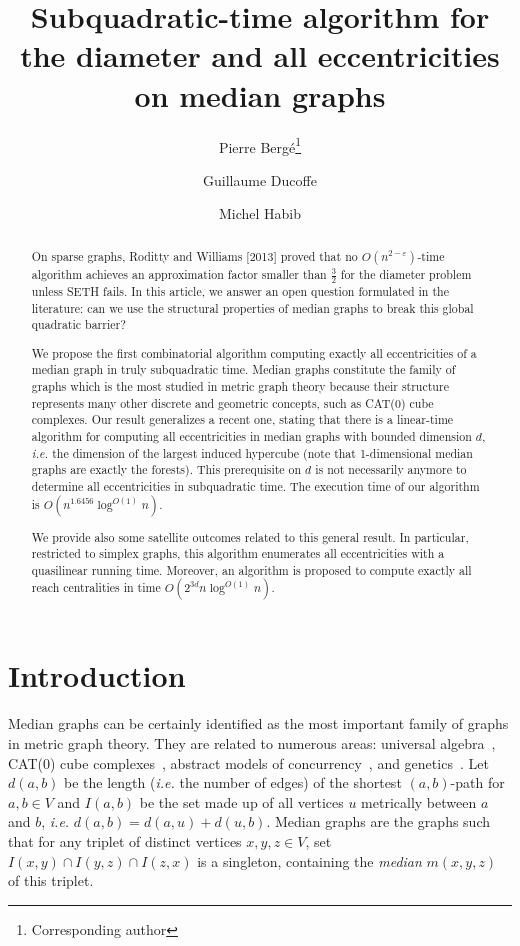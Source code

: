 \documentclass[a4paper,UKenglish,numberwithinsect,cleveref, autoref]{lipics-v2021}
\title{Subquadratic-time algorithm for the diameter and all eccentricities on median graphs}
\author{Pierre Berg\'e\footnote{Corresponding author}}{Univ Lyon, CNRS, ENS de Lyon, Universit\'e Claude Bernard Lyon 1, LIP, France \and IRIF, CNRS, Universit\'e de Paris, France}{}{}{}
\author{Guillaume {Ducoffe}}{National Institute for Research and Development in Informatics, Romania \and University of Bucharest, Romania}{}{}{}
\author{Michel {Habib}}{IRIF, CNRS, Universit\'e de Paris, France}{}{}{}
\begin{document}
\maketitle

\begin{abstract}
On sparse graphs, Roditty and Williams [2013] proved that no $O(n^{2-\varepsilon})$-time algorithm achieves an approximation factor smaller than $\frac{3}{2}$ for the diameter problem unless SETH fails.
In this article, we answer an open question formulated in the literature: can we use the structural properties of median graphs to break this global quadratic barrier?

We propose the first combinatorial algorithm computing exactly all eccentricities of a median graph in truly subquadratic time. Median graphs constitute the family of graphs which is the most studied in metric graph theory because their structure represents many other discrete and geometric concepts, such as CAT(0) cube complexes. Our result generalizes a recent one, stating that there is a linear-time algorithm for computing all eccentricities in median graphs with bounded dimension $d$, {\em i.e.} the dimension of the largest induced hypercube (note that 1-dimensional median graphs are exactly the forests). This prerequisite on $d$ is not necessarily anymore to determine all eccentricities in subquadratic time. The execution time of our algorithm is $O(n^{1.6456}\log^{O(1)} n)$.

We provide also some satellite outcomes related to this general result. In particular, restricted to simplex graphs, this algorithm enumerates all eccentricities with a quasilinear running time. Moreover, an algorithm is proposed to compute exactly all reach centralities in time $O(2^{3d}n\log^{O(1)}n)$.
\end{abstract}

\newpage

\section{Introduction} \label{sec:intro}

Median graphs can be certainly identified as the most important family of graphs in metric graph theory. They are related to numerous areas: universal algebra~\cite{Av61,BiKi47}, CAT(0) cube complexes~\cite{BaCh08,Ch00}, abstract models of concurrency~\cite{BaCo93,SaNiWi93}, and genetics~\cite{BaQuSaMa02,BaFoSyRi95}. Let $d(a,b)$ be the length ({\em i.e.} the number of edges) of the shortest $(a,b)$-path for $a,b \in V$ and $I(a,b)$ be the set made up of all vertices $u$ metrically between $a$ and $b$, {\em i.e.} $d(a,b) = d(a,u) + d(u,b)$. Median graphs are the graphs such that for any triplet of distinct vertices $x,y,z \in V$, set $I(x,y) \cap I(y,z) \cap I(z,x)$ is a singleton, containing the \textit{median} $m(x,y,z)$ of this triplet.
\end{document}
